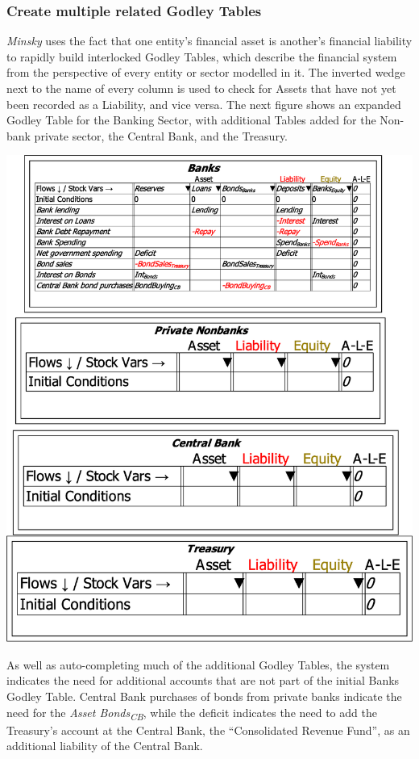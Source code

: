 \subsubsection{Create multiple related Godley Tables}

\emph{Minsky} uses the fact that one entity's financial asset is another's
financial liability to rapidly build interlocked Godley Tables, which
describe the financial system from the perspective of every entity
or sector modelled in it. The inverted wedge 
next to the name of every column is used to check for Assets that
have not yet been recorded as a Liability, and vice versa. The next
figure shows an expanded Godley Table for the Banking Sector, with
additional Tables added for the Non-bank private sector, the Central
Bank, and the Treasury.

\includegraphics[width=15cm]{images/GodleyTableImagesMultiTablesUnfinished}

As well as auto-completing much of the additional Godley Tables, the
system indicates the need for additional accounts that are not part
of the initial Banks Godley Table. Central Bank purchases of bonds
from private banks indicate the need for the \emph{Asset Bonds}\textsubscript{\emph{CB}},
while the deficit indicates the need to add the Treasury's account
at the Central Bank, the ``Consolidated Revenue Fund'', as an additional
liability of the Central Bank.

